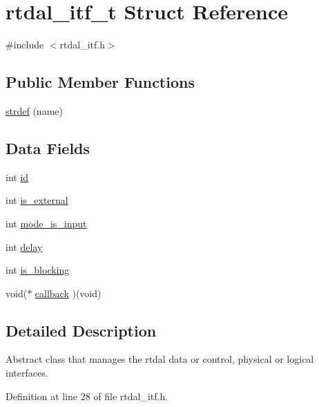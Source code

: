 \hypertarget{structrtdal__itf__t}{\section{rtdal\-\_\-itf\-\_\-t Struct Reference}
\label{structrtdal__itf__t}
}


{\ttfamily \#include $<$rtdal\-\_\-itf.\-h$>$}

\subsection*{Public Member Functions}
\begin{DoxyCompactItemize}
\item 
\hyperlink{structrtdal__itf__t_aa2f74b9c2aaa4a639e56f4b07f8a54e7}{strdef} (name)
\end{DoxyCompactItemize}
\subsection*{Data Fields}
\begin{DoxyCompactItemize}
\item 
int \hyperlink{structrtdal__itf__t_a454450582d66e41b8d7388cc00979227}{id}
\item 
int \hyperlink{structrtdal__itf__t_a7aa5980c8e478bc1ea1496a0be71091e}{is\-\_\-external}
\item 
int \hyperlink{structrtdal__itf__t_afda665341072e66ef18a5b90e39f816b}{mode\-\_\-is\-\_\-input}
\item 
int \hyperlink{structrtdal__itf__t_ac8c1717c2f6c250ffb99b645c54060ea}{delay}
\item 
int \hyperlink{structrtdal__itf__t_a46040cf579288e274af70c0f517ba70a}{is\-\_\-blocking}
\item 
void($\ast$ \hyperlink{structrtdal__itf__t_a64be55b2d31d03289ec240ce3531f4d0}{callback} )(void)
\end{DoxyCompactItemize}


\subsection{Detailed Description}
Abstract class that manages the rtdal data or control, physical or logical interfaces. 

Definition at line 28 of file rtdal\-\_\-itf.\-h.



